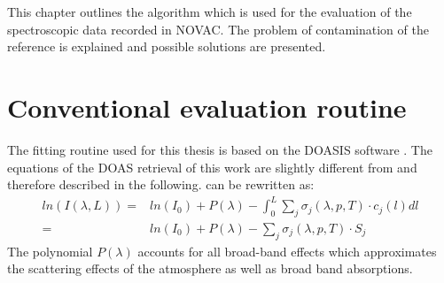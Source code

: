 

This chapter outlines the algorithm which is used for the evaluation of the spectroscopic data recorded in NOVAC. 
The problem of contamination of the reference is explained and possible solutions are presented.

\section{Conventional evaluation routine}
The fitting routine used for this thesis is based on the DOASIS software \citep{kraus2006doasis}. 
The equations of the DOAS retrieval of this work are slightly different from  and therefore described in the following.
 can be rewritten as:
\begin{align}
ln\left(I\left(\lambda, L\right)\right) = &ln\left(I_0 \right) + P \left(\lambda\right) -	\int_{0}^{L}\sum_{j}\sigma_j \left(\lambda, p, T \right) \cdot c_j \left(l\right)dl \nonumber \\
= &ln\left(I_0 \right) + P \left(\lambda\right)-
\sum_{j}\sigma_j \left(\lambda, p, T \right) \cdot S_j
\label{eq:lben}
\end{align}
%
The polynomial $ P \left(\lambda\right)$ accounts for all broad-band effects which approximates the scattering effects of the atmosphere as well as broad band absorptions.

